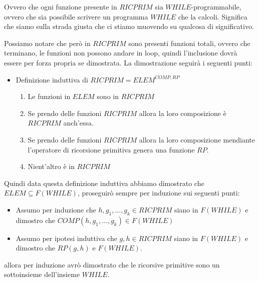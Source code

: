 \documentclass{article}
\begin{document}
Ovvero che ogni funzione presente in $RICPRIM$ sia $WHILE$-programmabile, ovvero che sia
possibile scrivere un programma $WHILE$ che la calcoli. Significa che siamo sulla strada
giusta che ci stiamo muovendo su qualcosa di significativo.

Possiamo notare che però in $RICPRIM$ sono presenti funzioni totali, ovvero che terminano,
le funzioni non possono andare in loop, quindi l'inclusione dovrà essere per forza propria
se dimostrata.
La dimostrazione seguirà i seguenti punti:
\begin{itemize}
    \item Definizione induttiva di $RICPRIM=ELEM^{COMP,RP}$
          \begin{enumerate}
              \item Le funzioni in $ELEM$ sono in $RICPRIM$
              \item Se prendo delle funzioni $RICPRIM$ allora la loro composizione è
                    $RICPRIM$ anch'essa.
              \item Se prendo delle funzioni $RICPRIM$ allora la loro composizione mendiante l'operatore
                    di ricorsione primitiva genera una funzione $RP$.
              \item Nient'altro è in $RICPRIM$
          \end{enumerate}
\end{itemize}

Quindi data questa definizione induttiva abbiamo dimostrato che $ELEM\subseteq F(WHILE)$,
proseguirò sempre per induzione sui seguenti punti:
\begin{itemize}
    \item Assumo per induzione che $h,g_1,\dots,g_k\in RICPRIM$ siano in $F(WHILE)$
          e dimostro che $COMP(h,g_1,\dots,g_k)\in F(WHILE)$
    \item Assumo per ipotesi induttiva che $g,h\in RICPRIM$ siano in $F(WHILE)$
          e dimostro che $RP(g,h)$ e $F(WHILE)$.
\end{itemize}

allora per induzione avrò dimostrato che le ricorsive primitive sono un sottoinsieme
dell'insieme $WHILE$.
\end{document}
